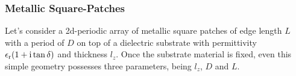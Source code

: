 \subsubsection{Metallic Square-Patches}
Let's consider a 2d-periodic array of metallic square patches of edge length $L$ with a period of $D$ on top of a dielectric substrate with permittivity $\epsilon_\mathrm{r}(1+\mathrm{i} \tan\delta)$ and thickness $l_z$. Once the substrate material is fixed, even this simple geometry possesses three parameters, being $l_z$, $D$ and $L$.

